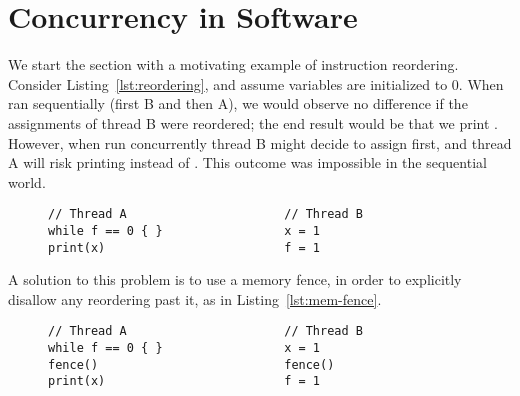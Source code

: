 \documentclass[b5paper]{report}
\begin{document}

\section{Concurrency in Software}



We start the section with a motivating example of instruction reordering.
Consider Listing~\ref{lst:reordering}, and assume variables are initialized to
0.  When ran sequentially (first B and then A), we would observe no difference
if the assignments of thread B were reordered; the end result would be that we
print . However, when run concurrently thread B might decide to assign
 first, and thread A will risk printing  instead of
. This outcome was impossible in the sequential world.
\begin{figure}[ht]
\begin{lstlisting}[caption=Instruction reordering,label=lst:reordering]
// Thread A                      // Thread B
while f == 0 { }                 x = 1
print(x)                         f = 1
\end{lstlisting}
\end{figure}

A solution to this problem is to use a memory fence, in order to explicitly
disallow any reordering past it, as in Listing~\ref{lst:mem-fence}.
\begin{figure}[ht]
\begin{lstlisting}[caption=Memory fence for synchronization,label=lst:mem-fence]
// Thread A                      // Thread B
while f == 0 { }                 x = 1
fence()                          fence()
print(x)                         f = 1
\end{lstlisting}
\end{figure}
\end{document}
